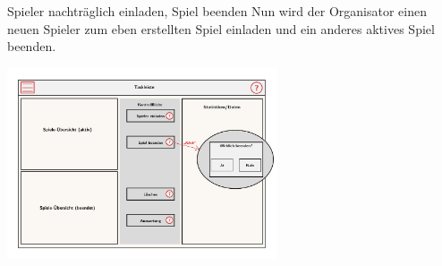 \documentclass[xcolor=dvipsnames]{beamer}
\begin{document}
    \begin{frame}
        \begin{block} {Spieler nachträglich einladen, Spiel beenden}
            Nun wird der Organisator einen neuen Spieler zum eben erstellten Spiel einladen und ein anderes aktives Spiel beenden.
        \end{block}
        \includegraphics[width=8cm]{../../pictures/2_Organisator.jpg}
    \end{frame}
\end{document}
